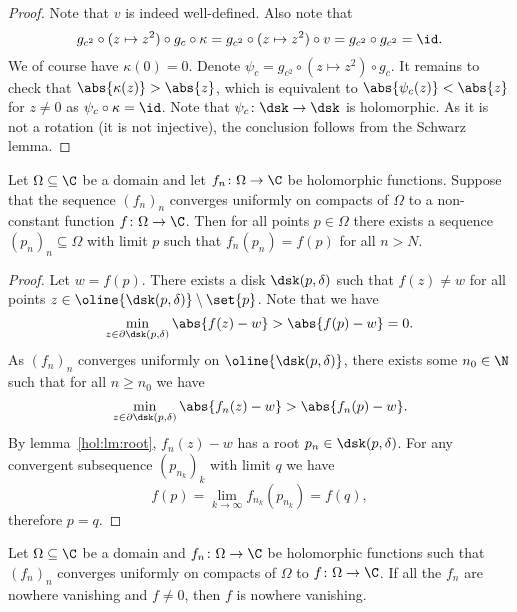 \begin{proof}
Note that $v$ is indeed well-defined. Also note that
\[
g_{c^2} \circ (z \mapsto z^2) \circ g_c \circ \kappa =
g_{c^2} \circ (z \mapsto z^2) \circ v =
g_{c^2} \circ g_{c^2} =
\id.
\]
We of course have $\kappa(0) = 0$. Denote
$\psi_c = g_{c^2} \circ (z \mapsto z^2) \circ g_c$. It remains to
check that $\abs{\kappa(z)} > \abs{z}$, which is equivalent to
$\abs{\psi_c(z)} < \abs{z}$ for $z \ne 0$ as
$\psi_c \circ \kappa = \id$. Note that
$\psi_c \colon \dsk \to \dsk$ is holomorphic. As it is not a
rotation (it is not injective), the conclusion follows from the
Schwarz lemma.
\end{proof}

\begin{lema}[Hurwitz]
Let $\Omega \subseteq \C$ be a domain and let
$f_n \colon \Omega \to \C$ be holomorphic functions. Suppose that
the sequence $(f_n)_n$ converges uniformly on compacts of $\Omega$
to a non-constant function $f \colon \Omega \to \C$. Then for all
points $p \in \Omega$ there exists a sequence
$(p_n)_n \subseteq \Omega$ with limit $p$ such that
$f_n(p_n) = f(p)$ for all $n > N$.
\end{lema}

\begin{proof}
Let $w = f(p)$. There exists a disk $\dsk(p, \delta)$ such that
$f(z) \ne w$ for all points
$z \in \oline{\dsk(p, \delta)} \setminus \set{p}$. Note that we
have
\[
\min_{z \in \partial \dsk(p, \delta)} \abs{f(z) - w} >
\abs{f(p) - w} =
0.
\]
As $(f_n)_n$ converges uniformly on $\oline{\dsk(p, \delta)}$,
there exists some $n_0 \in \N$ such that for all $n \geq n_0$ we
have
\[
\min_{z \in \partial \dsk(p, \delta)} \abs{f_n(z) - w} >
\abs{f_n(p) - w}.
\]
By lemma~\ref{hol:lm:root}, $f_n(z) - w$ has a root
$p_n \in \dsk(p, \delta)$. For any convergent subsequence
$(p_{n_k})_k$ with limit $q$ we have
\[
f(p) = \lim_{k \to \infty} f_{n_k}(p_{n_k}) = f(q),
\]
therefore $p = q$.
\end{proof}

\begin{posledica}\label{thm_hol:cor:hurw}
Let $\Omega \subseteq \C$ be a domain and
$f_n \colon \Omega \to \C$ be holomorphic functions such that
$(f_n)_n$ converges uniformly on compacts of $\Omega$ to
$f \colon \Omega \to \C$. If all the $f_n$ are nowhere vanishing
and $f \ne 0$, then $f$ is nowhere vanishing.
\end{posledica}

\obvs

